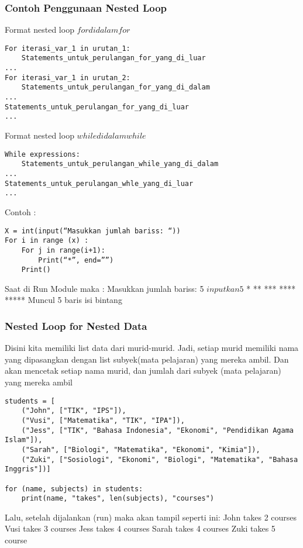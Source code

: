 \subsubsection{Contoh Penggunaan Nested Loop}
Format nested loop \(for di dalam for\)
\begin{verbatim}
For iterasi_var_1 in urutan_1:
	Statements_untuk_perulangan_for_yang_di_luar
...
For iterasi_var_1 in urutan_2:
	Statements_untuk_perulangan_for_yang_di_dalam
...
Statements_untuk_perulangan_for_yang_di_luar
...
\end{verbatim}

Format nested loop \(while di dalam while\)
\begin{verbatim}
While expressions:
	Statements_untuk_perulangan_while_yang_di_dalam
...
Statements_untuk_perulangan_whle_yang_di_luar
...
\end{verbatim}

Contoh :
\begin{verbatim}
X = int(input(“Masukkan jumlah bariss: “))
For i in range (x) :
	For j in range(i+1):
		Print(“*”, end=””)
	Print()
\end{verbatim}
Saat di Run Module maka :
Masukkan jumlah bariss: 5 \(inputkan 5\)
*
**
***
****
***** 
Muncul 5 baris isi bintang

\subsubsection{Nested Loop for Nested Data}
Disini kita memiliki list data dari murid-murid. Jadi, setiap murid memiliki nama yang dipasangkan dengan list subyek(mata pelajaran) yang mereka ambil. Dan akan mencetak setiap nama murid, dan jumlah dari subyek (mata pelajaran) yang mereka ambil
\begin{verbatim}
students = [
    ("John", ["TIK", "IPS"]),
    ("Vusi", ["Matematika", "TIK", "IPA"]),
    ("Jess", ["TIK", "Bahasa Indonesia", "Ekonomi", "Pendidikan Agama Islam"]),
    ("Sarah", ["Biologi", "Matematika", "Ekonomi", "Kimia"]),
    ("Zuki", ["Sosiologi", "Ekonomi", "Biologi", "Matematika", "Bahasa Inggris"])]

for (name, subjects) in students:
    print(name, "takes", len(subjects), "courses")
\end{verbatim}
Lalu, setelah dijalankan (run) maka akan tampil seperti ini:
John takes 2 courses
Vusi takes 3 courses
Jess takes 4 courses
Sarah takes 4 courses
Zuki takes 5 course

